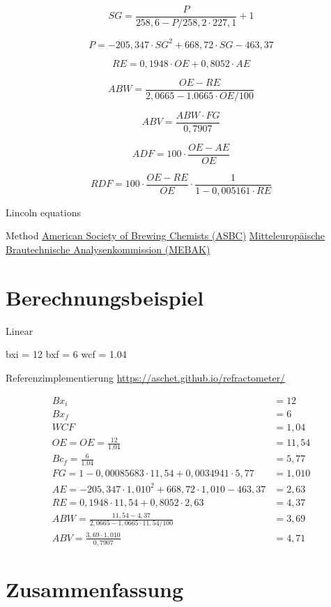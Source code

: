 \documentclass[a4paper,parskip=half]{scrartcl}
\newcommand{\bxi}{\mathit{Bx}_i}
\newcommand{\bxic}{\mathit{OE}}
\newcommand{\bxf}{\mathit{Bx}_f}
\newcommand{\bxfc}{\mathit{Bc}_f}
\newcommand{\sg}{\mathit{SG}}
\newcommand{\fg}{\mathit{FG}}
\newcommand{\abv}{\mathit{ABV}}
\newcommand{\abw}{\mathit{ABW}}
\newcommand{\oex}{\mathit{OE}}
\newcommand{\aex}{\mathit{AE}}
\newcommand{\rex}{\mathit{RE}}
\newcommand{\wcf}{\mathit{WCF}}
\newcommand{\adf}{\mathit{ADF}}
\newcommand{\rdf}{\mathit{RDF}}
\begin{document}
\begin{equation}
\sg = \frac{P}{258,6 - \mathit{P} / 258,2 \cdot 227,1} + 1
\end{equation}

\begin{equation}
P = -205,347 \cdot \sg^2 + 668,72 \cdot \sg - 463,37
\end{equation}

\begin{equation}
\rex = 0,1948 \cdot \oex + 0,8052 \cdot \aex
\end{equation}

\begin{equation}
\abw = \frac{\oex - \rex}{2,0665 - 1.0665 \cdot \oex / 100}
\end{equation}

\begin{equation}
\abv = \frac{\abw \cdot \fg}{0,7907}
\end{equation}

\autocite{Spedding2016}

\begin{equation}
\adf = 100 \cdot \frac{\oex - \aex}{\oex}
\end{equation}

\setlength{\jot}{2mm}

\begin{equation}
\rdf = 100 \cdot \frac{\oex - \rex}{\oex} \cdot \frac{1}{1 - 0,005161 \cdot \rex}
\end{equation}

\autocite{Speers2015}

Lincoln equations
\autocite{Spedding2016}

Method \href{https://www.asbcnet.org}{American Society of Brewing Chemists (ASBC)} \href{https://www.mebak.org}{Mitteleuropäische Brautechnische Analysenkommission (MEBAK)}

\section*{Berechnungsbeispiel}

Linear

bxi = 12
bxf = 6
wcf = 1.04

Referenzimplementierung \url{https://aschet.github.io/refractometer/}


\begin{align*}
\bxi &= 12 \\
\bxf &= 6 \\
\wcf &= 1,04 \\
\oex = \bxic = \frac{12}{1.04} &= 11,54 \\
\bxfc = \frac{6}{1.04} &= 5,77 \\
\fg = 1 - 0,00085683 \cdot 11,54 + 0,0034941 \cdot 5,77 &= 1,010 \\
\aex = -205,347 \cdot 1,010^2 + 668,72 \cdot 1,010 - 463,37 &= 2,63 \\
\rex = 0,1948 \cdot 11,54 + 0,8052 \cdot 2,63 &= 4,37 \\
\abw = \frac{11,54 - 4,37}{2,0665 - 1,0665 \cdot 11,54 / 100} &= 3,69 \\
\abv = \frac{3,69 \cdot 1,010}{0,7907} &= 4,71
\end{align*}

\section*{Zusammenfassung}

\printbibliography[title=Quellen]
\end{document}
